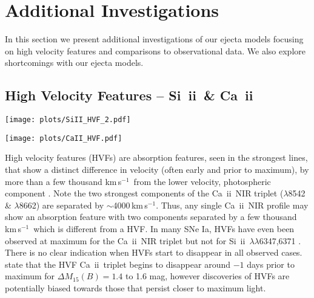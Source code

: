 \documentclass[useAMS,usenatbib,useasmath]{mnras}
\newcommand{\kms}{\hbox{km$\,$s$^{-1}$}}
\def\lesssim{\mathrel{\hbox{\rlap{\hbox{\lower4pt\hbox{$\sim$}}}\hbox{$<$}}}}
\newcommand{\caii}{\mbox{Ca~{\sc ii}}}
\newcommand{\skii}{\mbox{Si~{\sc ii}}}
\newcommand{\lb}{$\lambda$}
\begin{document}
\section{Additional Investigations}
In this section we present additional investigations of our ejecta models focusing on high velocity features and comparisons to observational data. We also explore shortcomings with our ejecta models.  

\subsection{High Velocity Features -- \skii\ \& \caii}

\label{section_HVF}%
\begin{figure*} 
\begin{minipage}[t]{\linewidth}
\centering
\hspace{0cm}\texttt{[image: plots/SiII\_HVF\_2.pdf]}
\end{minipage}
\caption{Normalized flux (according to Eqn. \ref{normalize} between 5800-6500 \AA) of the \skii\ \lb6347,6371 doublet relative to bolometric maximum plotted in velocity space shifted relative to \lb6355. Note the lack of \skii\ HVFs. A vertical line at $-15\,000$~\kms\ is included as a reference.}
\label{HVF_Sk2}
\end{figure*}
\begin{figure*} 
\begin{minipage}[t]{\linewidth}
\centering
\hspace{0cm}\texttt{[image: plots/CaII\_HVF.pdf]}
\end{minipage}
\caption{Normalized flux (according to Eqn. \ref{normalize} between 7000-9000 \AA) of the \caii\ triplet relative to bolometric maximum plotted in velocity space shifted relative to \lb8662. Note prior to $\lesssim$-11 days, HVFs are present without a photospheric component. After the HVF disappears, the photospheric component becomes visible. A vertical line at $-15\,000$~\kms\ is included as a reference.}
\label{HVF_Ca2}
\end{figure*}

High velocity features (HVFs) are absorption features, seen in the strongest lines, that show a distinct difference in velocity (often early and prior to maximum), by more than a few thousand \kms\, from the lower velocity, photospheric component \citep{Gerardy2004,Mazzali2005a,Mazzali2005b}. Note the two strongest components of the \caii\ NIR triplet (\lb8542 \& \lb8662) are separated by $\sim$4000\,\kms. Thus, any single \caii\ NIR profile may show an absorption feature with two components separated by a few thousand \kms\, which is different from a HVF. In many SNe Ia, HVFs have even been observed at maximum for the \caii\ NIR triplet but not for \skii\ \lb\lb6347,6371 \citep{Childress2014}. There is no clear indication when HVFs start to disappear in all observed cases.  \cite{Silverman2015} state that the HVF \caii\ triplet begins to disappear around $-1$ days prior to maximum for $\Delta M_{15}(B)=1.4$ to 1.6 mag, however discoveries of HVFs are potentially biased towards those that persist closer to maximum light. 
\end{document}

